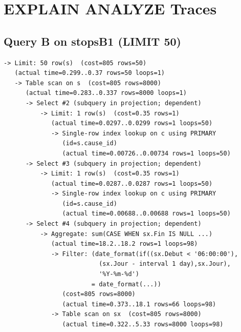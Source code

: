 \chapter{EXPLAIN ANALYZE Traces}

\section{Query B on stopsB1 (LIMIT 50)}
\label{app:explain-b1}

\begin{verbatim}
-> Limit: 50 row(s)  (cost=805 rows=50)
   (actual time=0.299..0.37 rows=50 loops=1)
   -> Table scan on s  (cost=805 rows=8000)
      (actual time=0.283..0.337 rows=8000 loops=1)
      -> Select #2 (subquery in projection; dependent)
          -> Limit: 1 row(s)  (cost=0.35 rows=1)
             (actual time=0.0297..0.0299 rows=1 loops=50)
             -> Single-row index lookup on c using PRIMARY
                (id=s.cause_id)
                (actual time=0.00726..0.00734 rows=1 loops=50)
      -> Select #3 (subquery in projection; dependent)
          -> Limit: 1 row(s)  (cost=0.35 rows=1)
             (actual time=0.0287..0.0287 rows=1 loops=50)
             -> Single-row index lookup on c using PRIMARY
                (id=s.cause_id)
                (actual time=0.00688..0.00688 rows=1 loops=50)
      -> Select #4 (subquery in projection; dependent)
          -> Aggregate: sum(CASE WHEN sx.Fin IS NULL ...)
             (actual time=18.2..18.2 rows=1 loops=98)
             -> Filter: (date_format(if((sx.Debut < '06:00:00'),
                          (sx.Jour - interval 1 day),sx.Jour),
                          '%Y-%m-%d')
                        = date_format(...))
                (cost=805 rows=8000)
                (actual time=0.373..18.1 rows=66 loops=98)
             -> Table scan on sx  (cost=805 rows=8000)
                (actual time=0.322..5.33 rows=8000 loops=98)
\end{verbatim}
